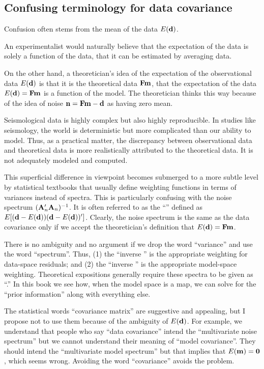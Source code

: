 \subsection{Confusing terminology for data covariance}
Confusion often stems from the mean of the data $E(\bold d)$.
\par
An experimentalist would naturally believe that
the expectation of the data
is solely a function of the data,
that it can be estimated by averaging data.
\par
On the other hand, a theoretician's idea
of the expectation of the observational data $E(\bold d)$
is that it is the theoretical data $\bold F\bold m$,
that the expectation of the data
$E(\bold d)=\bold F\bold m $ is a function of the model.
The theoretician thinks this way because of the idea
of noise $\bold n=\bold F\bold m-\bold d$ as having zero mean.
\par
Seismological data is highly complex but also highly reproducible.
In studies like seismology,
the world is deterministic but more complicated than our ability to model.
Thus, as a practical matter,
the discrepancy between observational data and theoretical data
is more realistically attributed to the theoretical data.
It is not adequately modeled and computed.
\par
This superficial difference in viewpoint becomes submerged
to a more subtle level
by statistical textbooks that usually define weighting functions
in terms of variances instead of spectra.
This is particularly confusing with the noise spectrum
$(\bold A'_n \bold A_n)^{-1}$.
It is often referred to as the ``''
defined as $E[(\bold d-E(\bold d))(\bold d-E(\bold d))']$.
Clearly, the noise spectrum is the same as the data covariance
only if we accept the theoretician's definition
that $E(\bold d)=\bold F\bold m$.
\par
There is no ambiguity and no argument
if we drop the word ``variance'' and use the word ``spectrum''.
Thus,
(1) the ``inverse ''
is the appropriate weighting for data-space residuals;
and (2) the ``inverse ''
is the appropriate model-space weighting.
Theoretical expositions generally require
these spectra to be given as ``.''
In this book we see how,
when the model space is a map,
we can solve for the ``prior information''
along with everything else.

\par
The statistical words ``covariance matrix'' are suggestive and appealing,
but I propose not to use them
because of the ambiguity of $E(\bold d)$.
For example, we understand that people who say ``data covariance''
intend the ``multivariate noise spectrum''
but we cannot understand their meaning of ``model covariance''.
They should intend the ``multivariate model spectrum''
but that implies that $E(\bold m)=\bold 0$,
which seems wrong.
Avoiding the word ``covariance'' avoids the problem.

